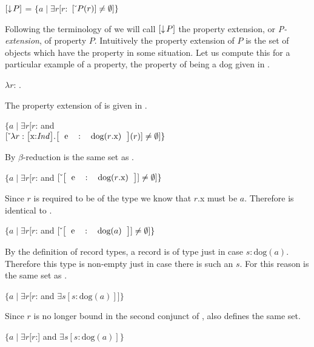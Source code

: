 \begin{ex} 
$[\downarrow\!P]$ = $\{a\mid\exists r[r:$
 $[\ \!\check{}\ \!P(r)]\not=\emptyset]\}$ 
\label{ex:propext}
\end{ex} 
Following the terminology of \cite{Cooper2011,Cooper2013} we will call
$[\downarrow\!P]$ the property extension, or \textit{P-extension}, of
property $P$. Intuitively the property extension of $P$ is the set of
objects which have the property in some situation.  Let us compute
this for a particular example of a property, the property of being a
dog given in \nexteg{}. 
\begin{ex} 
$\lambda r$: .  
\end{ex}
The property extension of \preveg{} is given in \nexteg{}.
\begin{ex} 
$\{a\mid\exists
  r[r$: and \\
\hspace*{2em}$\down{\lambda
  r:\text{\smallrecord{\smalltfield{x}{\textit{Ind}}}}
  . \text{\record{\tfield{e}{dog($r$.x)}}}(r)} \not=\emptyset]\}$ 
\end{ex} 
By $\beta$-reduction \preveg{} is the same set as \nexteg{}.
\begin{ex} 
$\{a\mid\exists
  r[r$: and 
$\down{\text{\record{\tfield{e}{dog($r$.x)}}}} \not=\emptyset]\}$  
\end{ex} 
Since $r$ is required to be of the type
 we know that $r$.x
must be $a$.  Therefore \preveg{} is identical to \nexteg{}.
\begin{ex} 
$\{a\mid\exists
  r[r$: and 
$\down{\text{\record{\tfield{e}{dog($a$)}}}} \not=\emptyset]\}$ 
\end{ex} 
By the definition of record types, a record
 is of type
 just in case $s:\text{dog}(a)$.
Therefore this type is non-empty just in case there is such an $s$.
For this reason \preveg{} is the same set as \nexteg{}.
\begin{ex} 
$\{a\mid\exists
  r[r$: and 
$\exists s [s:\text{dog}(a)]]\}$ 
\end{ex}
Since $r$ is no longer bound in the second conjunct of \preveg{},
\nexteg{} also defines the same set.
\begin{ex} 
$\{a\mid\exists
  r[r$:] and 
$\exists s [s:\text{dog}(a)]\}$ 
\end{ex} 
